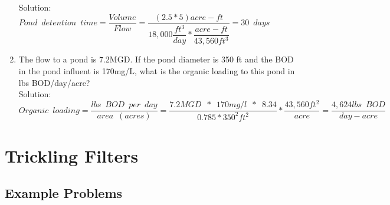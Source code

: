 \documentclass{article}
\begin{document}
\begin{enumerate}
Solution:\\
$Pond \enspace detention \enspace time=\dfrac{Volume}{Flow}=\dfrac{(2.5*5)acre-ft}{18,000\dfrac{ft^3}{day}*\dfrac{acre-ft}{43,560ft^3}}=\boxed{30 \enspace days}$\\ 

\item The flow to a pond is 7.2MGD. If the pond diameter is 350 ft and the BOD in the pond influent is 170mg/L, what is the organic loading to this pond in lbs BOD/day/acre?
\\
Solution:\\
$Organic \enspace loading=\dfrac{lbs \enspace BOD \enspace per \enspace day}{area \enspace (acres)}=\dfrac{7.2MGD \enspace * \enspace 170mg/l \enspace * \enspace 8.34}{0.785*350^2ft^2}*\dfrac{43,560ft^2}{acre}=\boxed{\dfrac{4,624lbs \enspace BOD}{day-acre}}$
\end{enumerate}


\section{Trickling Filters}

\subsection{Example Problems} 
\end{document}
